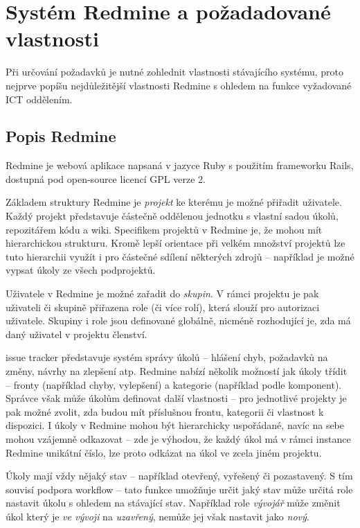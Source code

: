 \documentclass[thesis=B,czech]{FITthesis}[2012/05/02]
\begin{document}
\chapter{Systém Redmine a požadadované vlastnosti}

Při určování požadavků je nutné zohlednit vlastnosti stávajícího
systému, proto nejprve popíšu nejdůležitější vlastnosti Redmine s
ohledem na funkce vyžadované ICT oddělením.

\section{Popis Redmine}

Redmine je webová aplikace napsaná v jazyce Ruby s použitím frameworku
Rails, dostupná pod open-source licencí \gls{GPL} verze 2.

Základem struktury Redmine je \emph{projekt} ke kterému je možné
přiřadit uživatele. Každý projekt představuje částečně oddělenou
jednotku s vlastní sadou úkolů, repozitářem kódu a \gls{wiki}.
Specifikem projektů v Redmine je, že mohou mít hierarchickou strukturu.
Kromě lepší orientace při velkém množství projektů lze tuto hierarchii
využít i pro částečné sdílení některých zdrojů -- například je možné
vypsat úkoly ze všech podprojektů.

Uživatele v Redmine je možné zařadit do \emph{skupin}. V rámci projektu
je pak uživateli či skupině přiřazena role (či více rolí), která slouží
pro autorizaci uživatele. Skupiny i role jsou definované globálně,
nicméně rozhodující je, zda má daný uživatel v projektu členství.

\Gls{issue tracker} představuje systém správy úkolů -- hlášení chyb,
požadavků na změny, návrhy na zlepšení atp. Redmine nabízí několik
možností jak úkoly třídit -- fronty (například chyby, vylepšení) a
kategorie (například podle komponent). Správce však může úkolům
definovat další vlastnosti -- pro jednotlivé projekty je pak možné
zvolit, zda budou mít příslušnou frontu, kategorii či vlastnost k
dispozici. I úkoly v Redmine mohou být hierarchicky uspořádané, navíc na
sebe mohou vzájemně odkazovat -- zde je výhodou, že každý úkol má v
rámci instance Redmine unikátní číslo, lze proto odkázat na úkol ve
zcela jiném projektu.

Úkoly mají vždy nějaký stav -- například otevřený, vyřešený či
pozastavený. S tím souvisí podpora \gls{workflow} -- tato funkce
umožňuje určit jaký stav může určitá role nastavit úkolu s ohledem na
stávající stav. Například role \emph{vývojář} může změnit úkol který je
\emph{ve vývoji} na \emph{uzavřený}, nemůže jej však nastavit jako
\emph{nový}.
\end{document}
